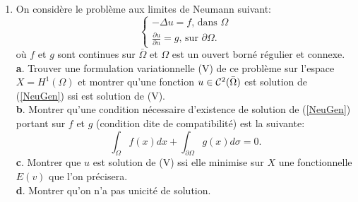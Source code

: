 \documentclass[12pt,a4paper]{article}
\begin{document}
\begin{enumerate}
\item On consid\`ere le probl\`eme aux limites de Neumann suivant:
\begin{equation}\label{NeuGen}
\begin{cases}
-\Delta u = f,\,\text{dans }\Omega\\
\frac{\partial u}{\partial n} = g,\,\text{sur }\partial\Omega.
\end{cases}
\end{equation}
o\`u $f$ et $g$ sont continues sur $\bar\Omega$ et $\Omega$ est un ouvert born\'e r\'egulier et connexe.\\
{\bf a}. Trouver une formulation variationnelle (V) de ce probl\`eme sur l'espace $X=H^1(\Omega)$ et montrer qu'une fonction $u\in{\cal C}^2(\bar\Omega)$ est solution de (\ref{NeuGen}) ssi est solution de (V).\\
{\bf b}. Montrer qu'une condition n\'ecessaire d'existence de solution
de (\ref{NeuGen}) portant sur $f$ et $g$ (condition dite de
compatibilit\'e) est la suivante:
$$
\int_{\Omega}f(x)dx+ \int_{\partial\Omega} g(x)d\sigma= 0.
$$
{\bf c}. Montrer que $u$ est solution de (V) ssi elle minimise sur $X$ une fonctionnelle $E(v)$ que l'on pr\'ecisera.\\
{\bf d}. Montrer qu'on n'a pas unicité de solution.

\end{enumerate}

\end{document}
